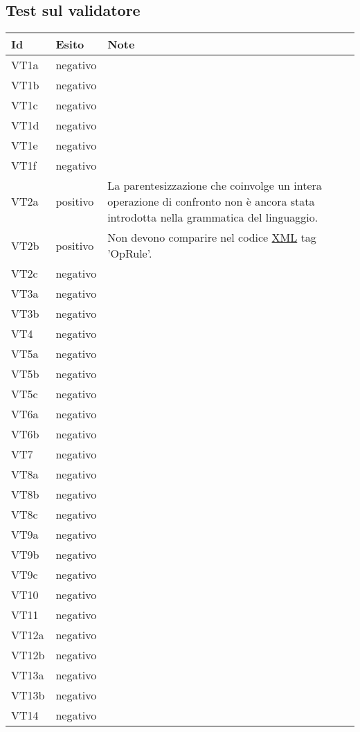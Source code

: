 \subsection{Test sul validatore}
\begin{center}
\begin{tabular}{|p{1cm}|p{1.6cm}|p{8.4cm}|} \hline
\textbf{Id} & \textbf{Esito} & \textbf{Note} \\ \hline
VT1a & negativo & \\ \hline
VT1b & negativo & \\ \hline
VT1c & negativo & \\ \hline
VT1d & negativo & \\ \hline
VT1e & negativo & \\ \hline
VT1f & negativo & \\ \hline
VT2a & \textcolor{err}{positivo} & La parentesizzazione che coinvolge un intera operazione di confronto non \`e ancora stata introdotta nella grammatica del linguaggio. \\ \hline
VT2b & \textcolor{err}{positivo} & Non devono comparire nel codice \underline{XML} tag 'OpRule'.\\ \hline
VT2c & negativo & \\ \hline
VT3a & negativo & \\ \hline
VT3b & negativo & \\ \hline
VT4 & negativo & \\ \hline
VT5a & negativo & \\ \hline
VT5b & negativo & \\ \hline
VT5c & negativo & \\ \hline
VT6a & negativo & \\ \hline
VT6b & negativo & \\ \hline
VT7 & negativo & \\ \hline
VT8a & negativo & \\ \hline
VT8b & negativo & \\ \hline
VT8c & negativo & \\ \hline
VT9a & negativo & \\ \hline
VT9b & negativo & \\ \hline
VT9c & negativo & \\ \hline
VT10 & negativo & \\ \hline
VT11 & negativo & \\ \hline
VT12a & negativo & \\ \hline
VT12b & negativo & \\ \hline
VT13a & negativo & \\ \hline
VT13b & negativo & \\ \hline
VT14 & negativo & \\ \hline
\end{tabular} \\
\end{center}

